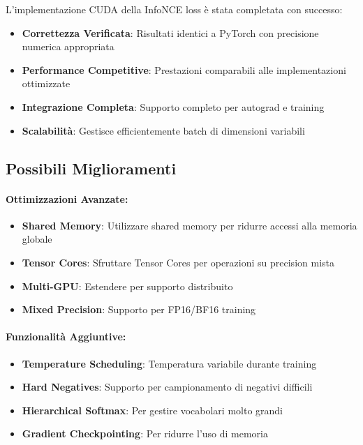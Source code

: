 \documentclass[a4paper,11pt]{article}
\begin{document}
L'implementazione CUDA della InfoNCE loss è stata completata con successo:

\begin{itemize}
    \item \textbf{Correttezza Verificata}: Risultati identici a PyTorch con precisione numerica appropriata
    \item \textbf{Performance Competitive}: Prestazioni comparabili alle implementazioni ottimizzate
    \item \textbf{Integrazione Completa}: Supporto completo per autograd e training
    \item \textbf{Scalabilità}: Gestisce efficientemente batch di dimensioni variabili
\end{itemize}

\subsection{Possibili Miglioramenti}

\paragraph{Ottimizzazioni Avanzate:}
\begin{itemize}
    \item \textbf{Shared Memory}: Utilizzare shared memory per ridurre accessi alla memoria globale
    \item \textbf{Tensor Cores}: Sfruttare Tensor Cores per operazioni su precision mista
    \item \textbf{Multi-GPU}: Estendere per supporto distribuito
    \item \textbf{Mixed Precision}: Supporto per FP16/BF16 training
\end{itemize}

\paragraph{Funzionalità Aggiuntive:}
\begin{itemize}
    \item \textbf{Temperature Scheduling}: Temperatura variabile durante training
    \item \textbf{Hard Negatives}: Supporto per campionamento di negativi difficili
    \item \textbf{Hierarchical Softmax}: Per gestire vocabolari molto grandi
    \item \textbf{Gradient Checkpointing}: Per ridurre l'uso di memoria
\end{itemize}
\end{document}
